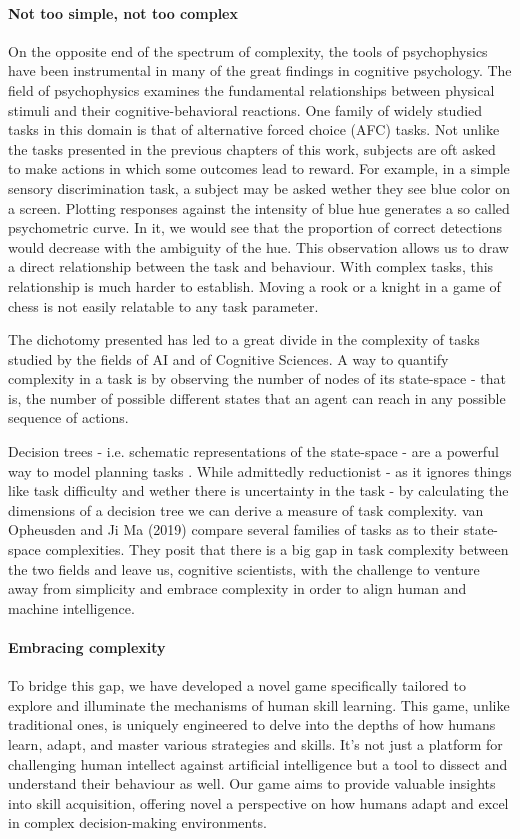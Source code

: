 \documentclass[11pt]{article}
\begin{document}
\paragraph{Not too simple, not too complex}
On the opposite end of the spectrum of complexity, the tools of psychophysics have been instrumental in many of the great findings in cognitive psychology. The field of psychophysics examines the fundamental relationships between physical stimuli and their cognitive-behavioral reactions. One family of widely studied tasks in this domain is that of alternative forced choice (AFC) tasks. Not unlike the tasks presented in the previous chapters of this work, subjects are oft asked to make actions in which some outcomes lead to reward. For example, in a simple sensory discrimination task, a subject may be asked wether they see blue color on a screen. Plotting responses against the intensity of blue hue generates a so called psychometric curve. In it, we would see that the proportion of correct detections would decrease with the ambiguity of the hue. This observation allows us to draw a direct relationship between the task and behaviour.
With complex tasks, this relationship is much harder to establish. Moving a rook or a knight in a game of chess is not easily relatable to any task parameter.

The dichotomy presented has led to a great divide in the complexity of tasks studied by the fields of AI and of Cognitive Sciences. A way to quantify complexity in a task is by observing the number of nodes of its state-space - that is, the number of possible different states that an agent can reach in any possible sequence of actions.

Decision trees - i.e. schematic representations of the state-space - are a powerful way to model planning tasks \cite{van2019tasks}. While admittedly reductionist - as it ignores things like task difficulty and wether there is uncertainty in the task - by calculating the dimensions of a decision tree we can derive a measure of task complexity. van Opheusden and Ji Ma (2019) compare several families of tasks as to their state-space complexities. They posit that there is a big gap in task complexity between the two fields and leave us, cognitive scientists, with the challenge to venture away from simplicity and embrace complexity in order to align human and machine intelligence.

\paragraph{Embracing complexity}
To bridge this gap, we have developed a novel game specifically tailored to explore and illuminate the mechanisms of human skill learning. This game, unlike traditional ones, is uniquely engineered to delve into the depths of how humans learn, adapt, and master various strategies and skills. It's not just a platform for challenging human intellect against artificial intelligence but a tool to dissect and understand their behaviour as well. Our game aims to provide valuable insights into skill acquisition, offering novel a perspective on how humans adapt and excel in complex decision-making environments.
\end{document}
